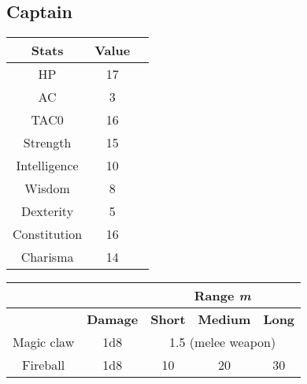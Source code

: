 \subsection{Captain}
\begin{table}[H]
  \centering
\begin{tabular}{|c|c|c|}
\hline
\rowcolor[HTML]{C0C0C0}
\textbf{Stats} & \textbf{Value } \\ \hline
HP & 17  \\ \hline
AC & 3 \\ \hline
TAC0 & 16 \\ \hline
Strength & 15  \\ \hline
Intelligence & 10 \\ \hline
Wisdom & 8 \\ \hline
Dexterity & 5  \\ \hline
Constitution & 16 \\ \hline
Charisma & 14 \\ \hline
\end{tabular}
\end{table}
\begin{table}[H]
\centering
\begin{tabular}{ll|c|c|c|}
\cline{3-5}
 &  & \multicolumn{3}{c|}{\cellcolor[HTML]{C0C0C0}\textbf{Range \textit{m}}} \\ \hline
\rowcolor[HTML]{C0C0C0}
\multicolumn{1}{|l|}{\cellcolor[HTML]{C0C0C0}\textbf{Weapon}} & \textbf{Damage} &\multicolumn{1}{l|}{\cellcolor[HTML]{C0C0C0}\textbf{Short}} & \textbf{Medium} & \textbf{Long} \\ \hline
\multicolumn{1}{|c|}{Magic claw} & \multicolumn{1}{c|}{1d8} & \multicolumn{3}{c|}{1.5 (melee weapon)} \\ \hline
\multicolumn{1}{|c|}{Fireball} & \multicolumn{1}{c|}{1d8} & 10 & 20 & 30 \\ \hline
\end{tabular}
\end{table}
